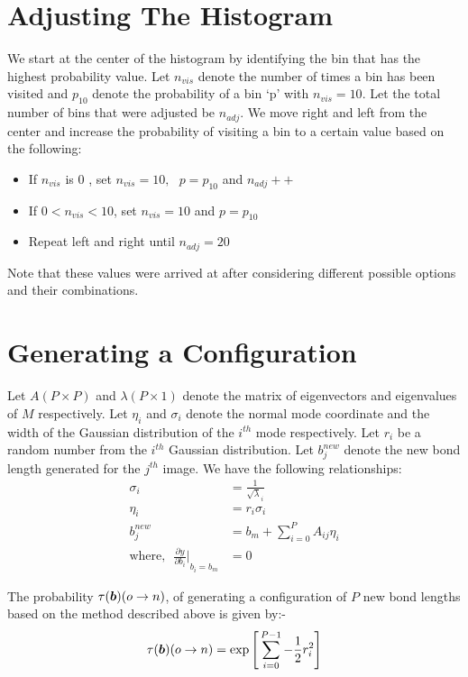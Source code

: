     \section{Adjusting The Histogram}
        We start at the center of the histogram by identifying the bin that has the highest probability value. Let $n_{vis}$ denote the number of times a bin has been visited and $p_{10}$ denote the probability of a bin `p' with $n_{vis} = 10$. Let the total number of bins that were adjusted be $n_{adj}$. We move right and left from the center and increase the probability of visiting a bin to a certain value based on the following:
        \begin{itemize}
            \item If $n_{vis}$ is $0$ , set $n_{vis} = 10, \: \: \: p = p_{10}$ and $n_{adj}++$
            \item If $0 < n_{vis} < 10$, set $n_{vis} = 10$ and $p = p_{10}$
            \item Repeat left and right until $n_{adj} = 20$
        \end{itemize}

        Note that these values were arrived at after considering different possible options and their combinations.

    \section{Generating a Configuration}
        Let $A (P \times P)$ and $\lambda (P \times 1)$ denote the matrix of eigenvectors  and eigenvalues of $M$ respectively. Let $\eta_i$ and $\sigma_i$ denote the normal mode coordinate and the width of the Gaussian distribution of the $i^{th}$ mode respectively. Let $r_i$ be a random number from the $i^{th}$ Gaussian distribution. Let $b^{new}_j$ denote the new bond length generated for the $j^{th}$ image. We have the following relationships:
        \begin{equation}
            \begin{aligned}
                \sigma_i &= \frac{1}{\sqrt \lambda_i}\\
                \eta_i &= r_i  \sigma_i\\
                b_j^{new} &= b_m + \displaystyle\sum\limits_{i=0}^P A_{ij}  \eta_i\\
                \text{where,} \: \: \: {\frac{\partial y}{\partial b_i} \Bigg|}_{b_i = b_m} &= 0
            \end{aligned}
        \end{equation}

        The probability $\tau({\boldsymbol {b}}) (o \to n)$, of generating a configuration of $P$ new bond lengths based on the method described above is given by:-
        \begin{equation}
            \tau ({\boldsymbol {b}}) (o \to n) = \exp \Bigg[ \displaystyle\sum\limits_{i=0}^{P-1} - \frac{1}{2}  r_i^2 \Bigg]
        \end{equation}
